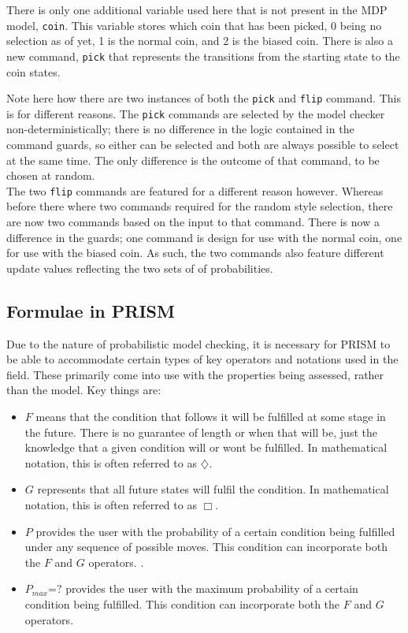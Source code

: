 \documentclass{l4proj}
\begin{document}
There is only one additional variable used here that is not present in the MDP model, {\tt coin}. This variable stores which coin that has been picked, 0 being no selection as of yet, 1 is the normal coin, and 2 is the biased coin. There is also a new command, {\tt pick} that represents the transitions from the starting state to the coin states.

Note here how there are two instances of both the {\tt pick} and {\tt flip} command. This is for different reasons. The {\tt pick} commands are selected by the model checker non-deterministically; there is no difference in the logic contained in the command guards, so either can be selected and both are always possible to select at the same time. The only difference is the outcome of that command, to be chosen at random.\\
The two {\tt flip} commands are featured for a different reason however. Whereas before there where two commands required for the random style selection, there are now two commands based on the input to that command. There is now a difference in the guards; one command is design for use with the normal coin, one for use with the biased coin. As such, the two commands also feature different update values reflecting the two sets of of probabilities.


\subsection{Formulae in PRISM}

Due to the nature of probabilistic model checking, it is necessary for PRISM to be able to accommodate certain types of key operators and notations used in the field. These primarily come into use with the properties being assessed, rather than the model. Key things are:
\begin{itemize}
\item $F$ means that the condition that follows it will be fulfilled at some stage in the future. There is no guarantee of length or when that will be, just the knowledge that a given condition will or wont be fulfilled. In mathematical notation, this is often referred to as $\diamondsuit$.
\item $G$ represents that all future states will fulfil the condition. In mathematical notation, this is often referred to as $\Box$.
\item $P$ provides the user with the probability of a certain condition being fulfilled under any sequence of possible moves. This condition can incorporate both the $F$ and $G$ operators. .
\item $P{_{max}}$=$?$ provides the user with the maximum probability of a certain condition being fulfilled. This condition can incorporate both the $F$ and $G$ operators. 
\end{itemize}
\end{document}
